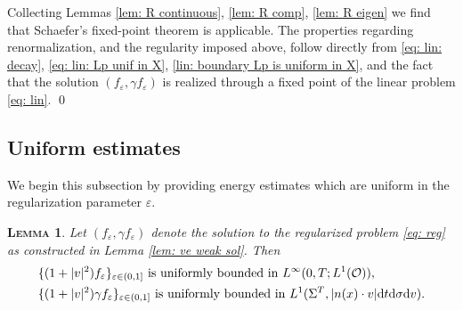 \documentclass[10pt, reqno]{amsart}
\theoremstyle{plain}
\newtheorem{lemma}[theorem]{\normalfont \scshape Lemma}
\theoremstyle{definition}
\theoremstyle{remark}
\renewenvironment{proof}[1][\proofname]{\noindent{\scshape #1.\quad}}{\qed}
\numberwithin{equation}{section}
\newcommand{\calO}{\mathcal O}
\newcommand{\ve}{\varepsilon}
\newcommand{\dv}{\textnormal{d}v}
\newcommand{\dt}{\textnormal{d}t}
\newcommand{\tnd}{\textnormal{d}}
\begin{document}
 

\begin{proof}[Proof of Lemma \ref{lem: ve weak sol}]
    Collecting Lemmas \ref{lem: R continuous}, \ref{lem: R comp}, \ref{lem: R eigen} we find that Schaefer's fixed-point theorem is applicable. The properties regarding renormalization, and the regularity imposed above, follow directly from \eqref{eq: lin: decay}, \eqref{eq: lin: Lp unif in X}, \eqref{lin: boundary Lp is uniform in X}, and the fact that the solution $(f_\ve, \gamma f_\ve)$ is realized through a fixed point of the linear problem \eqref{eq: lin}.
\end{proof}


%
%
%
%
%
%

\subsection{Uniform estimates} \label{subsec: uniform estimates}
We begin this subsection by providing energy estimates which are uniform in the regularization parameter $\ve$. 

\begin{lemma}\label{lem: energy}
    Let $(f_\ve, \gamma f_\ve)$ denote the solution to the regularized problem \eqref{eq: reg} as constructed in Lemma \ref{lem: ve weak sol}. Then
    \begin{align*}
        &\textnormal{$\{(1+|v|^2)f_\ve\}_{\ve\in (0,1]}$ is uniformly bounded in $L^\infty(0,T;L^1(\calO))$}, \\
        &\textnormal{$\{(1+|v|^2)\gamma f_\ve\}_{\ve\in (0,1]}$ is uniformly bounded in $L^1(\Sigma^T, |n(x)\cdot v|\dt\tnd\sigma \dv)$}.
    \end{align*}
\end{lemma}
\end{document}
